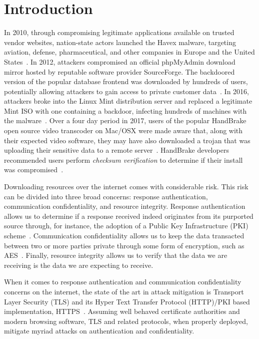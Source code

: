 \section{Introduction} \label{sec:introduction}

In 2010, through compromising legitimate applications available on trusted
vendor websites, nation-state actors launched the Havex malware, targeting
aviation, defense, pharmaceutical, and other companies in Europe and the United
States~\cite{SCA-HAVEX1, SCA-HAVEX2}. In 2012, attackers compromised an official
phpMyAdmin download mirror hosted by reputable software provider SourceForge.
The backdoored version of the popular database frontend was downloaded by
hundreds of users, potentially allowing attackers to gain access to private
customer data~\cite{SCA-PMA1, SCA-PMA2}. In 2016, attackers broke into the Linux
Mint distribution server and replaced a legitimate Mint ISO with one containing
a backdoor, infecting hundreds of machines with the malware~\cite{SCA-MINT1,
SCA-MINT2}. Over a four day period in 2017, users of the popular HandBrake open
source video transcoder on Mac/OSX were made aware that, along with their
expected video software, they may have also downloaded a trojan that was
uploading their sensitive data to a remote server~\cite{SCA-HB1}. HandBrake
developers recommended users perform \emph{checksum verification} to determine
if their install was compromised~\cite{SCA-HB2}.

Downloading resources over the internet comes with considerable risk. This risk
can be divided into three broad concerns: response authentication, communication
confidentiality, and resource integrity. Response authentication allows us to
determine if a response received indeed originates from its purported source
through, for instance, the adoption of a Public Key Infrastructure (PKI)
scheme~\cite{PKI}. Communication confidentiality allows us to keep the data
transacted between two or more parties private through
some form of encryption, such as AES~\cite{AES}. Finally, resource integrity
allows us to verify that the data we are receiving is the data we are expecting
to receive.

When it comes to response authentication and communication confidentiality
concerns on the internet, the state of the art in attack mitigation is Transport
Layer Security (TLS) and its Hyper Text Transfer Protocol (HTTP)/PKI based
implementation, HTTPS~\cite{TLS1.2, TLS1, TLS0, HTTPS, PKI}. Assuming well
behaved certificate authorities and modern browsing software, TLS and related
protocols, when properly deployed, mitigate myriad attacks on authentication and
confidentiality.

